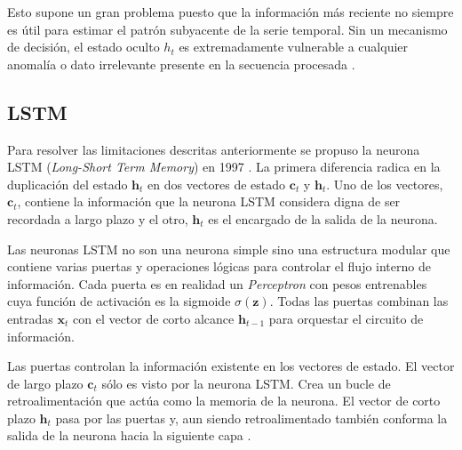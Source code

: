 Esto supone un gran problema puesto que la información más reciente no siempre es útil para estimar el patrón subyacente de la serie temporal. Sin un mecanismo de decisión, el estado oculto $h_t$ es extremadamente vulnerable a cualquier anomalía o dato irrelevante presente en la secuencia procesada \cite{rnn3}.


\subsection{LSTM}
Para resolver las limitaciones descritas anteriormente se propuso la neurona LSTM (\textit{Long-Short Term Memory}) en 1997 \cite{lstm}. La primera diferencia radica en la duplicación del estado $\textbf{h}_t$ en dos vectores de estado $\textbf{c}_t$ y $\textbf{h}_t$. Uno de los vectores, $\textbf{c}_t$, contiene la información que la neurona LSTM considera digna de ser recordada a largo plazo y el otro, $\textbf{h}_t$ es el encargado de la salida de la neurona.

Las neuronas LSTM no son una neurona simple sino una estructura modular que contiene varias puertas y operaciones lógicas para controlar el flujo interno de información. Cada puerta es en realidad un \textit{Perceptron} con pesos entrenables cuya función de activación es la sigmoide $\sigma(\textbf{z})$. Todas las puertas combinan las entradas $\textbf{x}_t$ con el vector de corto alcance $\textbf{h}_ {t-1}$ para orquestar el circuito de información.

Las puertas controlan la información existente en los vectores de estado. El vector de largo plazo $\textbf{c}_t$ sólo es visto por la neurona LSTM. Crea un bucle de retroalimentación que actúa como la memoria de la neurona. El vector de corto plazo $\textbf{h}_t$ pasa por las puertas y, aun siendo retroalimentado también conforma la salida de la neurona hacia la siguiente capa \cite{lstm2}.

